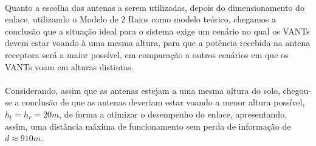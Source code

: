 \paragraph{}Quanto a escolha das antenas a serem utilizadas, depois do dimensionamento do enlace, utilizando o Modelo de 2 Raios como modelo teórico, chegamos a conclusão que a situação ideal para o sistema exige um cenário no qual os VANTs devem estar voando à uma mesma altura, para que a potência recebida na antena receptora será a maior possível, em comparação a outros cenários em que os VANTs voam em alturas distintas. 

\paragraph{}Considerando, assim que as antenas estejam a uma mesma altura do solo, chegou-se a conclusão de que as antenas deveriam estar voando a menor altura possível, $h_t = h_r = 20m$, de forma a otimizar o desempenho do enlace, apresentando, assim, uma distância máxima de funcionamento sem perda de informação de $d \approx 910m$. 